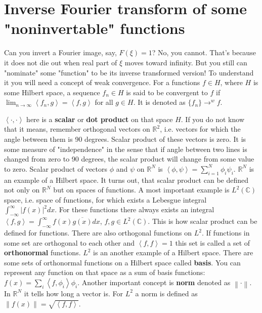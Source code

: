 \documentclass[a4paper,11pt,fleqn]{article}
\begin{document}
\section {Inverse Fourier transform of some "noninvertable" functions}
Can you invert a Fourier image, say, $F(\xi)=1$? No, you cannot. That's because it does not die out when real part of $\xi$
moves toward infinity. But you still can "nominate" some "function" to be its inverse transformed version! To understand it
you will need a concept of weak convergence. For a functions $f \in H$, where $H$ is some Hilbert space, a sequence $f_{n} \in H$
is said to be convergent to $f$ if $\lim_{n \to \infty} \left<f_{n},g\right> = \left<f,g\right>$ for all $g \in H$. It is denoted as
$\{f_{n}\} \to^{w} f$.

 $\left<\cdot, \cdot\right>$ here is a \textbf{scalar} or \textbf{dot product} on that space $H$. If you do not
know that it means, remember orthogonal vectors on $\mathbb{R}^{2}$, i.e. vectors for which the angle between them is 90 degrees. Scalar product
of these vectors is zero. It is some measure of "independence" in the sense that if angle between two lines is changed from zero to 90 degrees, the
scalar product will change from some value to zero. Scalar product of vectors $\phi$ and $\psi$ on $\mathbb{R}^{N}$ is 
$\left<\phi,\psi\right> = \sum_{i=1}^{N} \phi_{i}\psi_{i}$. $\mathbb{R}^{N}$ is an example of a Hilbert space. It turns out, that scalar product
can be defined not only on $\mathbb{R}^{N}$ but on spaces of functions. A most important example is $L^{2}(\mathbb{C})$ space, i.e. space of functions,
for which exists a Lebesgue integral $\int_{-\infty}^{\infty} {\left|f(x)\right|}^{2} dx$. For these functions there always exists an integral
$\left<f,g\right> = \int_{-\infty}^{\infty} f(x)\overline{g(x)}dx$, $f,g \in L^{2}(\mathbb{C})$. This is how scalar product can be defined for functions.
There are also orthogonal functions on $L^2$. If functions in some set are orthogonal to each other and $\left<f,f\right> = 1$ this set is called a set
of \textbf{orthonormal} functions. $L^2$ is an another example of a Hilbert space. There are some sets of orthonormal functions on a Hilbert space called
\textbf{basis}. You can represent any function on that space as a sum of basis functions: $f(x) = \sum_{i}\left<f,\phi_{i}\right>\phi_{i}$. Another important
concept is \textbf{norm} denoted as $\left\lVert\cdot\right\rVert$. In $\mathbb{R}^{N}$ it tells how long a vector is. For $L^2$ a norm is defined as 
$\left\lVert f(x) \right\rVert  = \sqrt{\left<f,f\right>}$.
\end{document}
